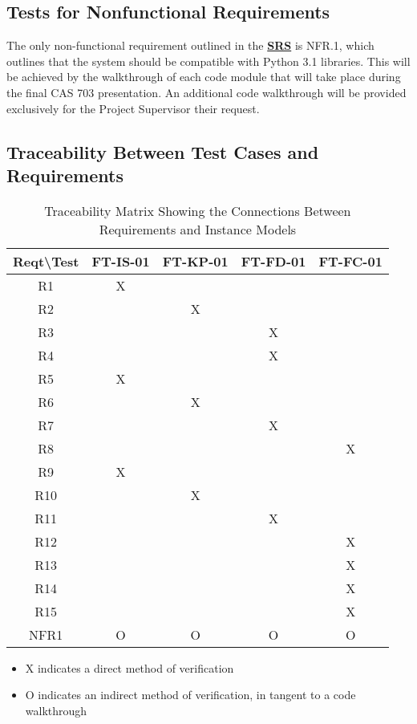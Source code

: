 \documentclass[12pt, titlepage]{article}
\begin{document}
\subsection{Tests for Nonfunctional Requirements}\label{NFR_Tests}
The only non-functional requirement outlined in the 
\textbf{\href{https://github.com/KiranSingh15/CAS-741-Image-Correspondences/blob/main/docs/SRS/SRS.pdf}
{SRS}} is NFR.1, which outlines that the system should be compatible with Python 3.1 libraries. 
This will be achieved by the walkthrough of each code module that will take place during the 
final CAS 703 presentation. An additional code walkthrough will be provided exclusively for
the Project Supervisor their request.

\newpage
\subsection{Traceability Between Test Cases and Requirements}
\begin{table}[h!]
  \centering
  \begin{tabular}{|c|c|c|c|c|}
  \hline
    Reqt\textbackslash Test & FT-IS-01 & FT-KP-01 & FT-FD-01 & FT-FC-01\\
  \hline
  R1    &X& & & \\ \hline
  R2    & &X& & \\ \hline
  R3    & & &X& \\ \hline
  R4    & & &X& \\ \hline
  R5    &X& & & \\ \hline
  R6    & &X& & \\ \hline
  R7    & & &X& \\ \hline
  R8    & & & &X\\ \hline
  R9    &X& & & \\ \hline
  R10   & &X& & \\ \hline
  R11   & & &X& \\ \hline
  R12   & & & &X\\ \hline
  R13   & & & &X\\ \hline
  R14   & & & &X\\ \hline
  R15   & & & &X\\ \hline
  NFR1  &O&O&O&O\\ \hline
  \hline
  \end{tabular}
  \caption{Traceability Matrix Showing the Connections Between Requirements and Instance Models}
  \label{Table:R_trace}
\end{table}

\begin{itemize}
\item X indicates a direct method of verification
\item O indicates an indirect method of verification, in tangent to a code walkthrough
\end{itemize}
\end{document}
